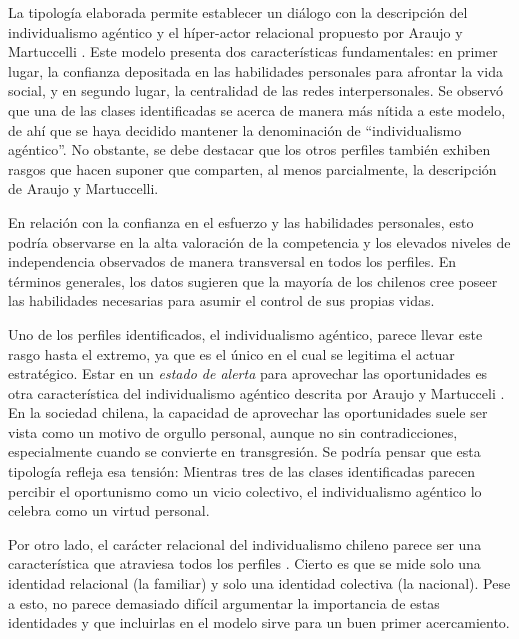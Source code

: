 \documentclass[12pt,twoside]{templates/facsothesis}
\begin{document}
La tipología elaborada permite establecer un diálogo con la descripción del individualismo agéntico y el híper-actor relacional propuesto por Araujo y Martuccelli \citeyearpar{araujo2020}. Este modelo presenta dos características fundamentales: en primer lugar, la confianza depositada en las habilidades personales para afrontar la vida social, y en segundo lugar, la centralidad de las redes interpersonales. Se observó que una de las clases identificadas se acerca de manera más nítida a este modelo, de ahí que se haya decidido mantener la denominación de ``individualismo agéntico''. No obstante, se debe destacar que los otros perfiles también exhiben rasgos que hacen suponer que comparten, al menos parcialmente, la descripción de Araujo y Martuccelli.

En relación con la confianza en el esfuerzo y las habilidades personales, esto podría observarse en la alta valoración de la competencia y los elevados niveles de independencia observados de manera transversal en todos los perfiles. En términos generales, los datos sugieren que la mayoría de los chilenos cree poseer las habilidades necesarias para asumir el control de sus propias vidas.

Uno de los perfiles identificados, el individualismo agéntico, parece llevar este rasgo hasta el extremo, ya que es el único en el cual se legitima el actuar estratégico. Estar en un \emph{estado de alerta} para aprovechar las oportunidades es otra característica del individualismo agéntico descrita por Araujo y Martucceli \citeyearpar{araujo2014}. En la sociedad chilena, la capacidad de aprovechar las oportunidades suele ser vista como un motivo de orgullo personal, aunque no sin contradicciones, especialmente cuando se convierte en transgresión. Se podría pensar que esta tipología refleja esa tensión: Mientras tres de las clases identificadas parecen percibir el oportunismo como un vicio colectivo, el individualismo agéntico lo celebra como un virtud personal.

Por otro lado, el carácter relacional del individualismo chileno parece ser una característica que atraviesa todos los perfiles \citep{araujo2014}. Cierto es que se mide solo una identidad relacional (la familiar) y solo una identidad colectiva (la nacional). Pese a esto, no parece demasiado difícil argumentar la importancia de estas identidades y que incluirlas en el modelo sirve para un buen primer acercamiento.
\end{document}

